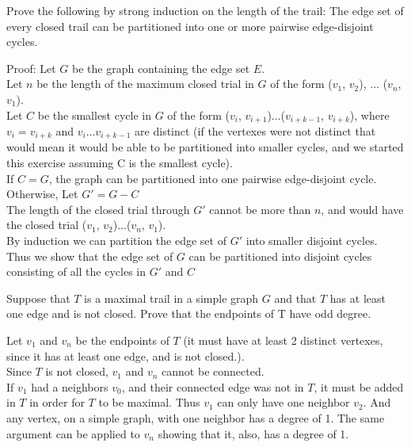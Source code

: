 \documentclass[12pt]{article}
\newenvironment{question}[2][Question]{\begin{trivlist}
\item[\hskip \labelsep {\bfseries #1}\hskip \labelsep {\bfseries #2.}]}{\end{trivlist}}
\begin{document}
\begin{question}{3}
Prove the following by strong induction on the length of the trail: The edge set of every closed trail can be partitioned into one or more pairwise edge-disjoint cycles.
\end{question}

Proof: Let $G$ be the graph containing the edge set $E$. \\

Let $n$ be the length of the maximum closed trial in $G$ of the form ($v_1$, $v_2$), ... ($v_n$, $v_1$). \\

Let $C$ be the smallest cycle in $G$ of the form ($v_i$, $v_{i+1}$)...($v_{i+k-1}$, $v_{i+k}$), where $v_i = v_{i+k}$ and $v_i$...$v_{i+k-1}$ are distinct (if the vertexes were not distinct that would mean it would be able to be partitioned into smaller cycles, and we started this exercise assuming C is the smallest cycle). \\

If $C = G$, the graph can be partitioned into one pairwise edge-disjoint cycle.\\

Otherwise, Let $G' = G - C$\\

The length of the closed trial through $G'$ cannot be more than $n$, and would have the closed trial ($v_1$, $v_2$)...($v_n$, $v_1$). \\

By induction we can partition the edge set of $G'$ into smaller disjoint cycles. Thus we show that the edge set of $G$ can be partitioned into disjoint cycles consisting of all the cycles in $G'$ and $C$\\


\begin{question}{4}
Suppose that $T$ is a maximal trail in a simple graph $G$ and that $T$ has at least one edge and is not closed. Prove that the endpoints of T have odd degree.
\end{question}

Let $v_1$ and $v_n$ be the endpoints of $T$ (it must have at least 2 distinct vertexes, since it has at least one edge, and is not closed.). \\

Since $T$ is not closed, $v_1$ and $v_n$ cannot be connected. \\

If $v_1$ had a neighbors $v_0$, and their connected edge was not in $T$, it must be added in $T$ in order for $T$ to be maximal. Thus $v_1$ can only have one neighbor $v_2$. And any vertex, on a simple graph, with one neighbor has a degree of 1. The same argument can be applied to $v_n$ showing that it, also, has a degree of 1.
\end{document}
